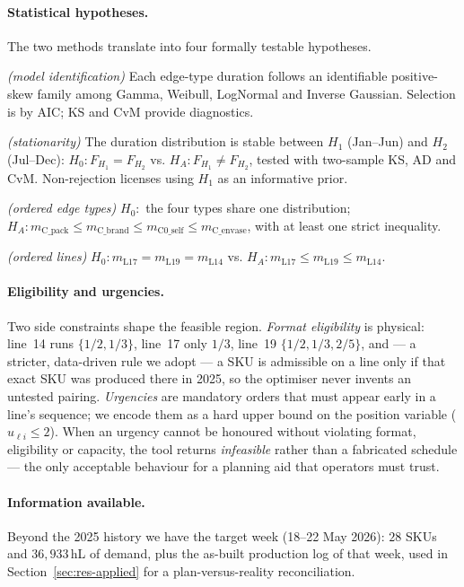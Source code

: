 \documentclass[11pt,a4paper]{article}
\begin{document}
\paragraph{Statistical hypotheses.}
The two methods translate into four formally testable hypotheses.
\begin{description}[leftmargin=3.2em,itemsep=2pt]
\item[\textbf{H1}] \emph{(model identification)} Each edge-type duration follows an
identifiable positive-skew family among Gamma, Weibull, LogNormal and Inverse
Gaussian. Selection is by AIC; KS and CvM provide diagnostics.
\item[\textbf{H2}] \emph{(stationarity)} The duration distribution is stable
between $H_1$ (Jan--Jun) and $H_2$ (Jul--Dec):
$H_0\!: F_{H_1}=F_{H_2}$ vs. $H_A\!: F_{H_1}\neq F_{H_2}$, tested with two-sample
KS, AD and CvM. Non-rejection licenses using $H_1$ as an informative prior.
\item[\textbf{H3}] \emph{(ordered edge types)} $H_0\!:$ the four types share one
distribution; $H_A\!: m_{\text{C\_pack}}\le m_{\text{C\_brand}}\le m_{\text{C0\_self}}
\le m_{\text{C\_envase}}$, with at least one strict inequality.
\item[\textbf{H4}] \emph{(ordered lines)} $H_0\!: m_{\text{L17}}=m_{\text{L19}}=
m_{\text{L14}}$ vs. $H_A\!: m_{\text{L17}}\le m_{\text{L19}}\le m_{\text{L14}}$.
\end{description}

\paragraph{Eligibility and urgencies.}
Two side constraints shape the feasible region. \emph{Format eligibility} is
physical: line~14 runs $\{1/2,1/3\}$, line~17 only $1/3$, line~19
$\{1/2,1/3,2/5\}$, and --- a stricter, data-driven rule we adopt --- a SKU is
admissible on a line only if that exact SKU was produced there in 2025, so the
optimiser never invents an untested pairing. \emph{Urgencies} are mandatory orders
that must appear early in a line's sequence; we encode them as a hard upper bound
on the position variable ($u_{\ell i}\le 2$). When an urgency cannot be honoured
without violating format, eligibility or capacity, the tool returns
\emph{infeasible} rather than a fabricated schedule --- the only acceptable
behaviour for a planning aid that operators must trust.

\paragraph{Information available.}
Beyond the 2025 history we have the target week (18--22 May 2026): $28$ SKUs and
$36{,}933$\,hL of demand, plus the as-built production log of that week, used in
Section~\ref{sec:res-applied} for a plan-versus-reality reconciliation.
\end{document}
